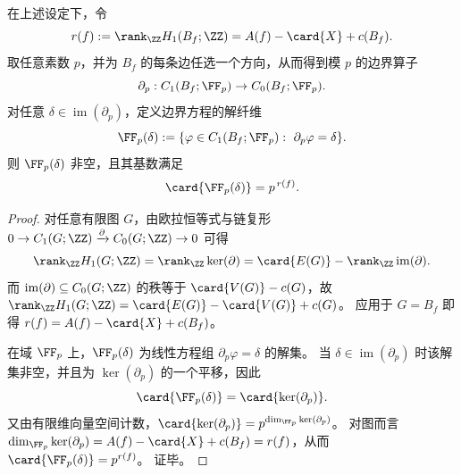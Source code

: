 \begin{theorem}[边界方程的仿射纤维与回路秩]\label{thm:spg-boundary-affine-fiber-cycle-rank}
在上述设定下，令
\[
r(f):=\rank_{\ZZ} H_1(B_f;\ZZ)=A(f)-\card{X}+c(B_f).
\]
取任意素数 \(p\)，并为 \(B_f\) 的每条边任选一个方向，从而得到模 \(p\) 的边界算子
\[
\partial_p:C_1(B_f;\FF_p)\to C_0(B_f;\FF_p).
\]
对任意 \(\delta\in \operatorname{im}(\partial_p)\)，定义边界方程的解纤维
\[
\FF_p(\delta):=\{\varphi\in C_1(B_f;\FF_p):\ \partial_p\varphi=\delta\}.
\]
则 \(\FF_p(\delta)\) 非空，且其基数满足
\[
\card{\FF_p(\delta)}=p^{\,r(f)}.
\]
\end{theorem}
\begin{proof}
对任意有限图 \(G\)，由欧拉恒等式与链复形 \(0\to C_1(G;\ZZ)\xrightarrow{\partial} C_0(G;\ZZ)\to 0\) 可得
\[
\rank_{\ZZ} H_1(G;\ZZ)
=\rank_{\ZZ}\ker(\partial)
=\card{E(G)}-\rank_{\ZZ}\operatorname{im}(\partial).
\]
而 \(\operatorname{im}(\partial)\subseteq C_0(G;\ZZ)\) 的秩等于 \(\card{V(G)}-c(G)\)，故
\(
\rank_{\ZZ}H_1(G;\ZZ)=\card{E(G)}-\card{V(G)}+c(G)
\)。
应用于 \(G=B_f\) 即得 \(r(f)=A(f)-\card{X}+c(B_f)\)。
\par
在域 \(\FF_p\) 上，\(\FF_p(\delta)\) 为线性方程组 \(\partial_p\varphi=\delta\) 的解集。
当 \(\delta\in\operatorname{im}(\partial_p)\) 时该解集非空，并且为 \(\ker(\partial_p)\) 的一个平移，因此
\[
\card{\FF_p(\delta)}=\card{\ker(\partial_p)}.
\]
又由有限维向量空间计数，\(\card{\ker(\partial_p)}=p^{\dim_{\FF_p}\ker(\partial_p)}\)。
对图而言 \(\dim_{\FF_p}\ker(\partial_p)=A(f)-\card{X}+c(B_f)=r(f)\)，从而 \(\card{\FF_p(\delta)}=p^{r(f)}\)。
证毕。
\end{proof}



